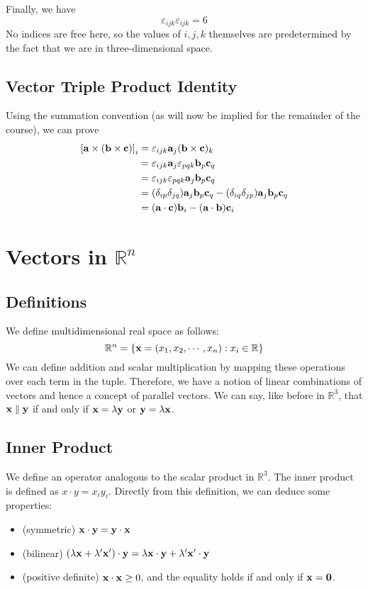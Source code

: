 \documentclass{article}
\begin{document}
Finally, we have
\[ \varepsilon_{ijk}\varepsilon_{ijk} = 6 \]
No indices are free here, so the values of $i, j, k$ themselves are predetermined by the fact that we are in three-dimensional space.

\subsection{Vector Triple Product Identity}
Using the summation convention (as will now be implied for the remainder of the course), we can prove
\begin{align*}
	\left[ \vb a \times (\vb b \times \vb c) \right]_i
	 & = \varepsilon_{ijk} \vb a_j (\vb b \times \vb c)_k                                                  \\
	 & = \varepsilon_{ijk} \vb a_j \varepsilon_{pqk} \vb b_p \vb c_q                                       \\
	 & = \varepsilon_{ijk}\varepsilon_{pqk} \vb a_j \vb b_p \vb c_q                                        \\
	 & = (\delta_{ip}\delta_{jq})\vb a_j \vb b_p \vb c_q - (\delta_{iq}\delta_{jp})\vb a_j \vb b_p \vb c_q \\
	 & = (\vb a \cdot \vb c) \vb b_i - (\vb a \cdot \vb b) \vb c_i
\end{align*}

\section{Vectors in $\mathbb R^n$}
\subsection{Definitions}
We define multidimensional real space as follows:
\[ \mathbb R^n = \{ \vb x = (x_1, x_2, \cdots, x_n) : x_i \in \mathbb R \} \]
We can define addition and scalar multiplication by mapping these operations over each term in the tuple. Therefore, we have a notion of linear combinations of vectors and hence a concept of parallel vectors. We can say, like before in $\mathbb R^3$, that $\vb x \parallel \vb y$ if and only if $\vb x = \lambda \vb y$ or $\vb y = \lambda \vb x$.

\subsection{Inner Product}
We define an operator analogous to the scalar product in $\mathbb R^3$. The inner product is defined as $x \cdot y = x_i y_i$. Directly from this definition, we can deduce some properties:
\begin{itemize}
	\item (symmetric) $\vb x \cdot \vb y = \vb y \cdot \vb x$
	\item (bilinear) $(\lambda \vb x + \lambda'\vb x')\cdot \vb y = \lambda \vb x\cdot \vb y + \lambda' \vb x' \cdot \vb y$
	\item (positive definite) $\vb x \cdot \vb x \geq 0$, and the equality holds if and only if $\vb x = \vb 0$.
\end{itemize}
\end{document}
